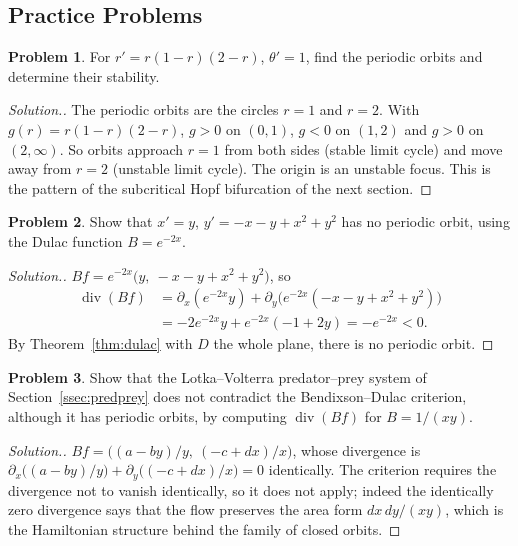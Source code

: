 \documentclass[11pt,a4paper]{article}
\numberwithin{equation}{section}
\theoremstyle{definition}
\newtheorem{problemx}{Problem}[subsection]
\newenvironment{problem}{\begin{problemx}}{\end{problemx}}
\newenvironment{solution}
  {\renewcommand{\qedsymbol}{}\begin{proof}[\textit{Solution}.]}
  {\end{proof}}
\begin{document}
\subsection{Practice Problems}

\begin{problem}
\label{prob:twocycles}
For $r' = r(1 - r)(2 - r)$, $\theta' = 1$, find the periodic orbits and determine their stability.
\end{problem}

\begin{solution}
The periodic orbits are the circles $r = 1$ and $r = 2$. With $g(r) = r(1 - r)(2 - r)$, $g > 0$ on $(0, 1)$, $g < 0$ on $(1, 2)$ and $g > 0$ on $(2, \infty)$. So orbits approach $r = 1$ from both sides (stable limit cycle) and move
away from $r = 2$ (unstable limit cycle). The origin is an unstable focus. This is the pattern of the subcritical Hopf bifurcation of the next section.
\end{solution}

\begin{problem}
Show that $x' = y$, $y' = -x - y + x^2 + y^2$ has no periodic orbit, using the Dulac function $B = e^{-2x}$.
\end{problem}

\begin{solution}
$Bf = e^{-2x}\bigl(y,\ -x - y + x^2 + y^2\bigr)$, so
\begin{align*}
\operatorname{div}(Bf) &= \partial_x(e^{-2x}y) + \partial_y\bigl(e^{-2x}(-x - y + x^2 + y^2)\bigr)\\
&= -2e^{-2x}y + e^{-2x}(-1 + 2y) = -e^{-2x} < 0 .
\end{align*}
By Theorem~\ref{thm:dulac} with $D$ the whole plane, there is no periodic orbit.
\end{solution}

\begin{problem}
Show that the Lotka--Volterra predator--prey system of Section~\ref{ssec:predprey} does not contradict the Bendixson--Dulac criterion, although it has periodic orbits, by computing $\operatorname{div}(Bf)$ for
$B = 1/(xy)$.
\end{problem}

\begin{solution}
$Bf = \bigl((a - by)/y,\ (-c + dx)/x\bigr)$, whose divergence is $\partial_x\bigl((a - by)/y\bigr) + \partial_y\bigl((-c + dx)/x\bigr) = 0$ identically. The criterion requires the divergence not to vanish identically, so it does not
apply; indeed the identically zero divergence says that the flow preserves the area form $dx\,dy/(xy)$, which is the Hamiltonian structure behind the family of closed orbits.
\end{solution}
\end{document}
